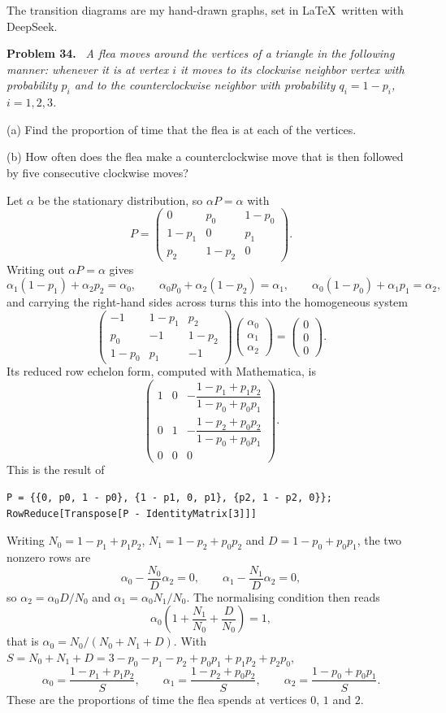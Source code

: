 \documentclass[11pt]{article}
\newenvironment{problem}[1]
  {\par\medskip\noindent\textbf{Problem #1.}\ \itshape}
  {\par\medskip}
\begin{document}
The transition diagrams are my hand-drawn graphs, set in \LaTeX\ written with DeepSeek.

\begin{problem}{34}
A flea moves around the vertices of a triangle in the following manner: whenever it is at vertex $i$ it moves to its clockwise neighbor vertex with probability $p_i$ and to the counterclockwise neighbor with probability $q_i=1-p_i$, $i=1,2,3$.

(a) Find the proportion of time that the flea is at each of the vertices.

(b) How often does the flea make a counterclockwise move that is then followed by five consecutive clockwise moves?
\end{problem}
Let $\alpha$ be the stationary distribution, so $\alpha P=\alpha$ with
\[
P=\begin{pmatrix}0&p_0&1-p_0\\ 1-p_1&0&p_1\\ p_2&1-p_2&0\end{pmatrix}.
\]
Writing out $\alpha P=\alpha$ gives
\[
\alpha_1(1-p_1)+\alpha_2p_2=\alpha_0,\qquad
\alpha_0p_0+\alpha_2(1-p_2)=\alpha_1,\qquad
\alpha_0(1-p_0)+\alpha_1p_1=\alpha_2,
\]
and carrying the right-hand sides across turns this into the homogeneous system
\[
\begin{pmatrix}-1&1-p_1&p_2\\ p_0&-1&1-p_2\\ 1-p_0&p_1&-1\end{pmatrix}
\begin{pmatrix}\alpha_0\\ \alpha_1\\ \alpha_2\end{pmatrix}
=\begin{pmatrix}0\\ 0\\ 0\end{pmatrix}.
\]
Its reduced row echelon form, computed with Mathematica, is
\[
\begin{pmatrix}
1&0&-\dfrac{1-p_1+p_1p_2}{1-p_0+p_0p_1}\\[8pt]
0&1&-\dfrac{1-p_2+p_0p_2}{1-p_0+p_0p_1}\\[8pt]
0&0&0
\end{pmatrix}.
\]
This is the result of
\begin{verbatim}
P = {{0, p0, 1 - p0}, {1 - p1, 0, p1}, {p2, 1 - p2, 0}};
RowReduce[Transpose[P - IdentityMatrix[3]]]
\end{verbatim}
Writing $N_0=1-p_1+p_1p_2$, $N_1=1-p_2+p_0p_2$ and $D=1-p_0+p_0p_1$, the two nonzero rows are
\[
\alpha_0-\frac{N_0}{D}\alpha_2=0,\qquad \alpha_1-\frac{N_1}{D}\alpha_2=0,
\]
so $\alpha_2=\alpha_0D/N_0$ and $\alpha_1=\alpha_0N_1/N_0$. The normalising condition then reads
\[
\alpha_0\left(1+\frac{N_1}{N_0}+\frac{D}{N_0}\right)=1,
\]
that is $\alpha_0=N_0/(N_0+N_1+D)$. With $S=N_0+N_1+D=3-p_0-p_1-p_2+p_0p_1+p_1p_2+p_2p_0$,
\[
\alpha_0=\frac{1-p_1+p_1p_2}{S},\qquad
\alpha_1=\frac{1-p_2+p_0p_2}{S},\qquad
\alpha_2=\frac{1-p_0+p_0p_1}{S}.
\]
These are the proportions of time the flea spends at vertices $0$, $1$ and $2$.
\end{document}
